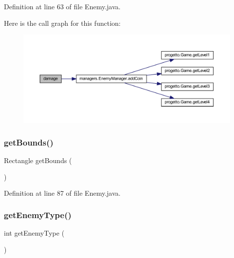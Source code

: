 Definition at line 63 of file Enemy.\+java.

Here is the call graph for this function\+:
\nopagebreak
\begin{figure}[H]
\begin{center}
\leavevmode
\includegraphics[width=350pt]{classenemies_1_1_enemy_ab316db3306dfd12457e3df71e933ca2d_cgraph}
\end{center}
\end{figure}
\mbox{\label{classenemies_1_1_enemy_a187945475e730bfa340a10f63224e91f}} 
\subsubsection{\texorpdfstring{get\+Bounds()}{getBounds()}}
{\footnotesize\ttfamily Rectangle get\+Bounds (\begin{DoxyParamCaption}{ }\end{DoxyParamCaption})}



Definition at line 87 of file Enemy.\+java.

\mbox{\label{classenemies_1_1_enemy_a40aced6dca930a3ae575a42b3286e230}} 
\subsubsection{\texorpdfstring{get\+Enemy\+Type()}{getEnemyType()}}
{\footnotesize\ttfamily int get\+Enemy\+Type (\begin{DoxyParamCaption}{ }\end{DoxyParamCaption})}



